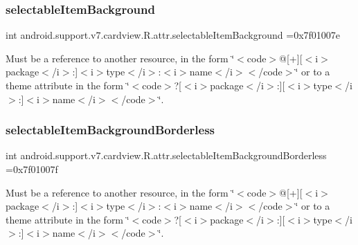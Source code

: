 \subsubsection{\texorpdfstring{selectable\+Item\+Background}{selectableItemBackground}}
{\footnotesize\ttfamily int android.\+support.\+v7.\+cardview.\+R.\+attr.\+selectable\+Item\+Background =0x7f01007e\hspace{0.3cm}{\ttfamily [static]}}

Must be a reference to another resource, in the form \char`\"{}$<$code$>$@\mbox{[}+\mbox{]}\mbox{[}$<$i$>$package$<$/i$>$\+:\mbox{]}$<$i$>$type$<$/i$>$\+:$<$i$>$name$<$/i$>$$<$/code$>$\char`\"{} or to a theme attribute in the form \char`\"{}$<$code$>$?\mbox{[}$<$i$>$package$<$/i$>$\+:\mbox{]}\mbox{[}$<$i$>$type$<$/i$>$\+:\mbox{]}$<$i$>$name$<$/i$>$$<$/code$>$\char`\"{}. \mbox{\label{classandroid_1_1support_1_1v7_1_1cardview_1_1R_1_1attr_abb688460f8a982ff21259f7207979ee1}} 
\subsubsection{\texorpdfstring{selectable\+Item\+Background\+Borderless}{selectableItemBackgroundBorderless}}
{\footnotesize\ttfamily int android.\+support.\+v7.\+cardview.\+R.\+attr.\+selectable\+Item\+Background\+Borderless =0x7f01007f\hspace{0.3cm}{\ttfamily [static]}}

Must be a reference to another resource, in the form \char`\"{}$<$code$>$@\mbox{[}+\mbox{]}\mbox{[}$<$i$>$package$<$/i$>$\+:\mbox{]}$<$i$>$type$<$/i$>$\+:$<$i$>$name$<$/i$>$$<$/code$>$\char`\"{} or to a theme attribute in the form \char`\"{}$<$code$>$?\mbox{[}$<$i$>$package$<$/i$>$\+:\mbox{]}\mbox{[}$<$i$>$type$<$/i$>$\+:\mbox{]}$<$i$>$name$<$/i$>$$<$/code$>$\char`\"{}. \mbox{\label{classandroid_1_1support_1_1v7_1_1cardview_1_1R_1_1attr_a895b2c4c5e40bf53be20402ec2dcd9a7}} 
